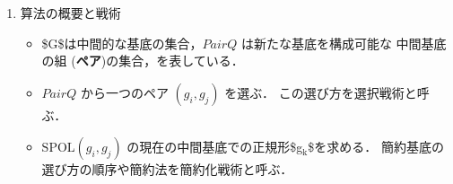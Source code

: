 \documentclass[a4j]{jarticle}
\begin{document}
{{\begin{enumerate}
\begin{quote}
Input: \$F = $\backslash${ f\(_{\text{1}}\), \ldots, f\(_{\text{l}}\)$\backslash$}\$\\
Output: Gröbner基底 \(G\) of \(Ideal(F)\)

\#+BEGIN\(_{\text{QUOTE}}\)
  \(PairQ \longleftarrow \phi\);\\
  \(G \longleftarrow \phi\);

\emph{foreach} (\(f_i \in F\)) \(\{\)

\#+BEGIN\(_{\text{QUOTE}}\)
  \$ PairQ \longleftarrow UpdatePairQ(PairQ, f\(_{\text{i}}\), F)\$;\\
  \$ G \longleftarrow UpdateBase(G, f\(_{\text{i}}\))\$;
\end{quote}

\(\}\)

\emph{while} ( \(PairQ \ne \phi\) ) \(\{\)

\begin{quote}
\((g_i, g_j) \longleftarrow\) \emph{select an element of \(PairQ\)};\\
\(PairQ \longleftarrow PairQ \setminus \{(g_i, g_j)\}\);\\
\(g_k \longleftarrow {{{\mathrm{SPOL}}(g_i, g_j)\!\downarrow_{G}}}\);

\emph{if} \$g\(_{\text{k}}\) \(\ne\) 0 \$ \(\{\)

\#+BEGIN\(_{\text{QUOTE}}\)
  \(PairQ \longleftarrow UpdateQ(PairQ, g_k, G)\);\\
  \(G \longleftarrow UpdateBase(G, g_k)\);
\end{quote}

  \(\}\)
\#+END\(_{\text{QUOTE}}\)

    \(\}\)
  \#+END\(_{\text{QUOTE}}\)
\#+END\(_{\text{QUOTE}}\)

\item 算法の概要と戦術
\label{sec:org0609778}

\begin{itemize}
\item \$G\$は中間的な基底の集合，\(PairQ\) は新たな基底を構成可能な
中間基底の組 (\textbf{ペア})の集合，を表している．

\item \(PairQ\) から一つのペア \((g_i, g_j)\) を選ぶ．
この選び方を選択戦術と呼ぶ．

\item \({\mathrm{SPOL}}(g_i, g_j)\) の現在の中間基底での正規形\$g\(_{\text{k}}\)\$を求める．
簡約基底の選び方の順序や簡約法を簡約化戦術と呼ぶ．


\end{itemize}
\end{enumerate}}}
\end{document}
